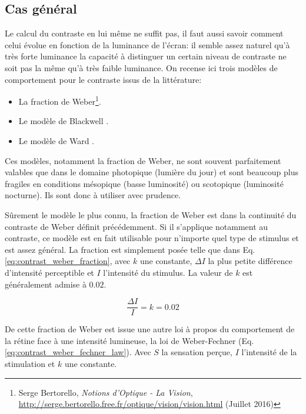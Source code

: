 	\subsection{Cas général}
	\par Le calcul du contraste en lui même ne suffit pas, il faut aussi savoir comment celui évolue en fonction de la luminance de l'écran: il semble assez naturel qu'à très forte luminance la capacité à distinguer un certain niveau de contraste ne soit pas la même qu'à très faible luminance. On recense ici trois modèles de comportement pour le contraste issus de la littérature:
	\begin{itemize}
		\item La fraction de Weber\footnote{Serge Bertorello, \textit{Notions d'Optique - La Vision}, \url{http://serge.bertorello.free.fr/optique/vision/vision.html} (Juillet 2016)}.
		\item Le modèle de Blackwell \citep{international_commission_on_illumination_analytic_1981}.
		\item Le modèle de Ward \citep{heckbert_contrast-based_1994}.
	\end{itemize}
	
	\par Ces modèles, notamment la fraction de Weber, ne sont souvent parfaitement valables que dans le domaine photopique (lumière du jour) et sont beaucoup plus fragiles en conditions mésopique (basse luminosité) ou scotopique (luminosité nocturne). Ils sont donc à utiliser avec prudence.

	\par Sûrement le modèle le plus connu, la fraction de Weber est dans la continuité du contraste de Weber définit précédemment. Si il s'applique notamment au contraste, ce modèle est en fait utilisable pour n'importe quel type de stimulus et est assez général. La fraction est simplement posée telle que dans Eq. \ref{eq:contrast_weber_fraction}, avec $k$ une constante, $\Delta I$ la plus petite différence d'intensité perceptible et $I$ l'intensité du stimulus. La valeur de $k$ est généralement admise à $0.02$.
	
	\begin{equation}
	\frac{\Delta I}{I} = k = 0.02
	\label{eq:contrast_weber_fraction}
	\end{equation}
	
	\par De cette fraction de Weber est issue une autre loi à propos du comportement de la rétine face à une intensité lumineuse, la loi de Weber-Fechner (Eq. \ref{eq:contrast_weber_fechner_law}). Avec $S$ la sensation perçue, $I$ l'intensité de la stimulation et $k$ une constante.
	
